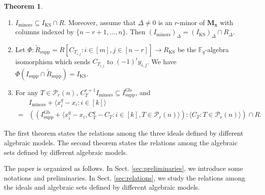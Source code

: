 \documentclass[a4paper, 11pt]{amsart}
\newcommand{\mc}[1]{\mathcal{#1}}
\newcommand{\ideala}[1]{\langle{#1}\rangle}
\newcommand{\kh}[1]{\left(#1\right)}
\newcommand{\td}[1]{\bm{#1}}
\newcommand{\tld}[1]{\tilde{#1}}
\newcommand{\tx}[1]{\text{#1}}
\newcommand{\fq}{\mathbb{F}_q}
\theoremstyle{definition}
\newtheorem{theorem}{Theorem}[section]
\theoremstyle{definition}
\begin{document}
	\begin{theorem}\label{thm:main thm}\,
		\begin{enumerate}
			\item  $I_{\tx{minors}}\subseteq I_{\tx{KS}}\cap R$. Moreover, assume that $\Delta\neq 0$ is an $r$-minor of $\td{M_x}$ with columns indexed by $\{n-r+1,\dots,n\}$. Then $(I_{\tx{minors}})_\Delta=(I_{\tx{KS}})_\Delta\cap R_\Delta$.
			\item Let $\Phi:\tld{R}_{\tx{supp}}=R[C_{T_{i,j}}:i\in[m],j\in[n-r]]\to R_{\tx{KS}}$ be the $\fq$-algebra isomorphism which sends $C_{T_{i,j}}$ to $(-1)^iy_{i,j}$. We have $\Phi(I_{\tx{supp}}\cap\tld{R}_{\tx{supp}})=I_{\tx{KS}}$.
			\item For any $T\in\mc{P}_r(n)$, $C_T^{r+1}I_{\tx{minors}}\subseteq I^{\tx{Gb}}_{\tx{supp}}$, and
			\begin{align*}
				&I_{\tx{minors}}+\ideala{x_i^q-x_i:i\in[k]}\\=&\kh{(I^{\tx{Gb}}_{\tx{supp}}+\ideala{x_i^q-x_i,C_T^q-C_T:i\in[k],T\in\mc{P}_r(n)}):\ideala{C_T:T\in\mc{P}_r(n)}}\cap R.
			\end{align*}
		\end{enumerate}
	\end{theorem}
	The first theorem states the relations among the three ideals defined by different algebraic models. The second theorem states the relations among the algebraic sets defined by different algebraic models.
	
	The paper is organized as follows. In Sect. \ref{sec:preliminaries}, we introduce some notations and preliminaries. In Sect. \ref{sec:relations}, we study the relations among the ideals and algebraic sets defined by different algebraic models.
	
	
\end{document}
